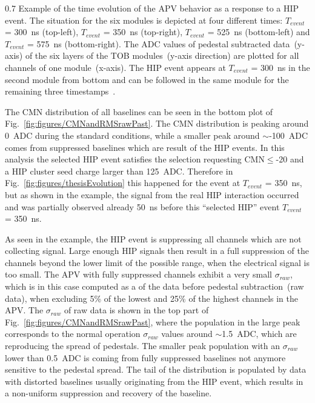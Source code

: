                  {0.7}       %
                 {Example of the time evolution of the APV behavior as a response to a HIP event. The situation for the six modules is depicted at four different times:  $T_{event}$ = 300~ns (top-left), $T_{event}$ = 350~ns (top-right), $T_{event}$ = 525~ns (bottom-left) and $T_{event}$ = 575~ns (bottom-right). The ADC values of pedestal subtracted data~(y-axis) of the six layers of the TOB modules~(y-axis direction) are plotted for all channels of one module~(x-axis). The HIP event appears at $T_{event}$ = 300~ns in the second module from bottom and can be followed in the same module for the remaining three timestamps~\cite{Bainbridge:2004jc}.} %

The CMN distribution of all baselines can be seen in the bottom plot of Fig.~\ref{fig:figures/CMNandRMSrawPast}. The CMN distribution is peaking around 0~ADC during the standard conditions, while a smaller peak around $\sim$-100~ADC comes from suppressed baselines which are result of the HIP events. In this analysis the selected HIP event satisfies the selection requesting CMN$\leq$-20 and a HIP cluster seed charge larger than 125~ADC. Therefore in Fig.~\ref{fig:figures/thesisEvolution} this happened for the event at $T_{event}$ = 350~ns, but as shown in the example, the signal from the real HIP interaction occurred and was partially observed already 50~ns before this ``selected HIP'' event $T_{event}$ = 350~ns.

As seen in the example, the HIP event is suppressing all channels which are not collecting signal. Large enough HIP signals then result in a full suppression of the channels beyond the lower limit of the possible range, when the electrical signal is too small. The APV with fully suppressed channels exhibit a very small $\sigma_{raw}$, which is in this case computed as a \SD of the data before pedestal subtraction~(raw data), when excluding 5\% of the lowest and 25\% of the highest channels in the APV. The \SD $\sigma_{raw}$ of raw data is shown in the top part of Fig.~\ref{fig:figures/CMNandRMSrawPast}, where the population in the large peak corresponds to the normal operation $\sigma_{raw}$ values around $\sim$1.5~ADC, which are reproducing the spread of pedestals. The smaller peak population with an $\sigma_{raw}$ lower than 0.5~ADC is coming from fully suppressed baselines not anymore sensitive to the pedestal spread. The tail of the distribution is populated by data with distorted baselines usually originating from the HIP event, which results in a non-uniform suppression and recovery of the baseline.


